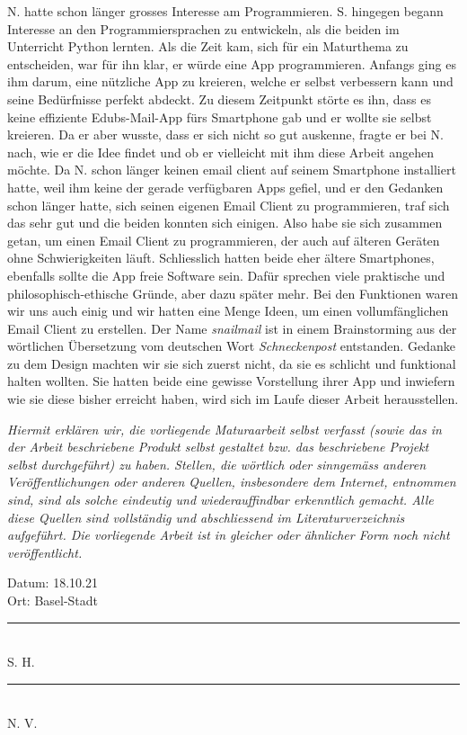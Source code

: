 \documentclass[a4paper,11pt]{article}
\newcommand{\doublesignature}[3][S. H.]{%
  \parbox{\textwidth}{
    \vspace{2cm}
    \centering Datum: #3 \\
    Ort: Basel-Stadt \\

    \parbox{7cm}{
      \centering
      \rule{6cm}{1pt}\\
       #1 
    }
    \hfill
    \parbox{7cm}{
      \centering
      \rule{6cm}{1pt}\\
      #2
    }
  }
}
\begin{document}
N. hatte schon länger grosses Interesse am Programmieren. S. hingegen begann Interesse an den Programmiersprachen zu entwickeln, als die beiden im Unterricht 
Python lernten. Als die Zeit kam, sich für ein Maturthema zu entscheiden, war für ihn klar, er würde eine App programmieren. Anfangs ging es ihm darum, eine 
nützliche App zu kreieren, welche er selbst verbessern kann und seine Bedürfnisse perfekt abdeckt.
Zu diesem Zeitpunkt störte es ihn, dass es keine effiziente Edubs-Mail-App fürs Smartphone gab und er wollte sie selbst kreieren. 
Da er aber wusste, dass er sich nicht so gut auskenne, fragte er bei N. nach, wie er die Idee findet und ob er vielleicht mit ihm diese Arbeit 
angehen möchte.
Da N. schon länger keinen \gls{email client} auf seinem Smartphone installiert hatte, weil ihm keine der gerade verfügbaren Apps gefiel, und er den Gedanken 
schon länger hatte, sich seinen eigenen Email Client zu programmieren, traf sich das sehr gut und die beiden konnten sich einigen. 
Also habe sie sich zusammen getan, um einen Email Client zu programmieren, der auch auf älteren Geräten ohne Schwierigkeiten läuft. Schliesslich hatten beide
eher ältere Smartphones, ebenfalls sollte die App \gls{freie Software} sein. 
Dafür sprechen viele praktische und philosophisch-ethische Gründe, aber dazu später mehr.
Bei den Funktionen waren wir uns auch einig und wir hatten eine Menge Ideen, um einen vollumfänglichen Email Client zu erstellen. Der Name \textit{snailmail} ist in einem 
Brainstorming aus der wörtlichen Übersetzung vom deutschen Wort \textit{Schneckenpost} entstanden. Gedanke zu dem Design machten wir sie sich zuerst nicht,
da sie es schlicht und funktional halten wollten. 
Sie hatten beide eine gewisse Vorstellung ihrer App und inwiefern wie sie diese bisher erreicht haben, wird sich im Laufe dieser Arbeit herausstellen. \\

{
\textit{Hiermit erklären wir, die vorliegende Maturaarbeit selbst verfasst (sowie das in der Arbeit
beschriebene Produkt selbst gestaltet bzw. das beschriebene Projekt selbst durchgeführt) zu
haben. Stellen, die wörtlich oder sinngemäss anderen Veröffentlichungen oder anderen Quellen,
insbesondere dem Internet, entnommen sind, sind als solche eindeutig und wiederauffindbar
erkenntlich gemacht. Alle diese Quellen sind vollständig und abschliessend im
Literaturverzeichnis aufgeführt. Die vorliegende Arbeit ist in gleicher oder ähnlicher Form noch
nicht veröffentlicht. } \\

\doublesignature{N. V.}{18.10.21}

}
\end{document}
